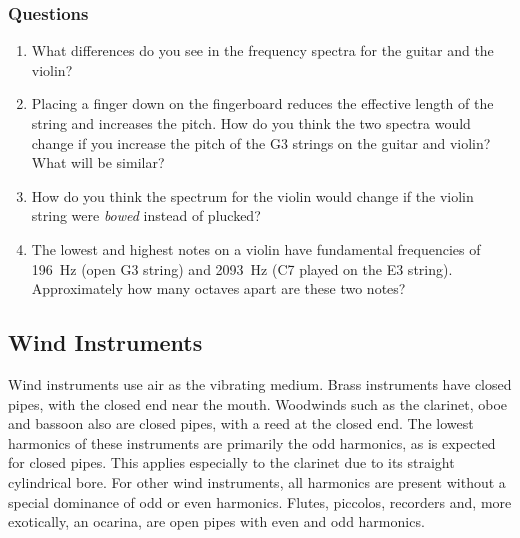 \documentclass[11pt]{NSF}
\def\ben{\begin{enumerate}}
\def\een{\end{enumerate}}
\begin{document}
\subsubsection*{Questions}
\ben
\item 
What differences do you see in the frequency spectra for the guitar
and the violin?

\item Placing a finger down on the fingerboard reduces the effective 
length of the string and increases the pitch.
How do you think the two spectra would change if you increase the 
pitch of the G3 strings on the guitar and violin?
What will be similar?

\item How do you think the spectrum for the violin would change if 
the violin string were {\em bowed} instead of plucked?

\item The lowest and highest notes on a violin have fundamental
frequencies of 196~Hz (open G3 string) and 2093~Hz (C7 played on 
the E3 string).  
Approximately how many octaves apart are these two notes?
\een

\subsection{Wind Instruments} 
Wind instruments use air as the vibrating medium. Brass instruments
have closed pipes, with the closed end near the mouth. Woodwinds such
as the clarinet, oboe and bassoon also are closed pipes, with a reed
at the closed end. The lowest harmonics of these instruments are
primarily the odd harmonics, as is expected for closed pipes. This
applies especially to the clarinet due to its straight cylindrical
bore. For other wind instruments, all harmonics are present without a
special dominance of odd or even harmonics. Flutes, piccolos,
recorders and, more exotically, an ocarina, are open pipes with even
and odd harmonics.  
\end{document}
